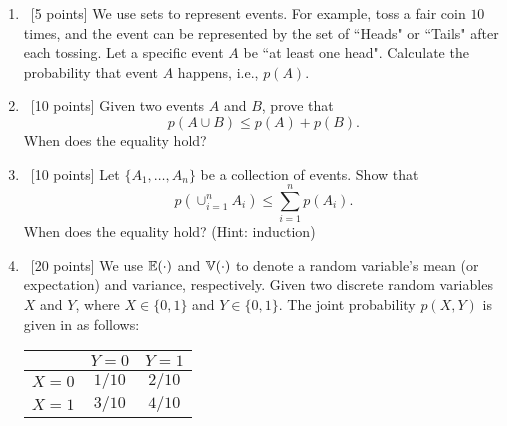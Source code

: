\documentclass[12pt, fullpage,letterpaper]{article}
\begin{document}
%
\begin{enumerate}
\item~[5 points] We use sets to represent events. For example, toss a fair coin $10$ times, and the event can be represented by the set of ``Heads" or ``Tails" after each tossing. Let a specific event $A$ be ``at least one head". Calculate the probability that event $A$ happens, i.e., $p(A)$.
\item~[10 points] Given two events $A$ and $B$, prove that 
\[
p(A \cup B) \le p(A) + p(B).
\]
When does the equality hold?
\item~[10 points] Let $\{A_1, \ldots, A_n\}$ be a collection of events. Show that
\[
p(\cup_{i=1}^n A_i) \le \sum_{i=1}^n p(A_i).
\]
When does the equality hold? (Hint: induction)
\item~[20 points]  We use $\mathbb{E}(\cdot)$ and $\mathbb{V}(\cdot)$ to denote a random variable's mean (or expectation) and variance, respectively. Given two discrete random variables $X$ and $Y$, where $X \in \{0, 1\}$ and $Y \in \{0,1\}$. The joint probability $p(X,Y)$ is given in as follows:
\begin{table}[h]
        \centering
        \begin{tabular}{ccc}
        \hline\hline
         & $Y=0$ & $Y=1$ \\ \hline
         $X=0$ & $1/10$ & $2/10$ \\ \hline
         $X=1$  & $3/10$ & $4/10$ \\ \hline\hline
        \end{tabular}
        \end{table}
	

\end{enumerate}
\end{document}
